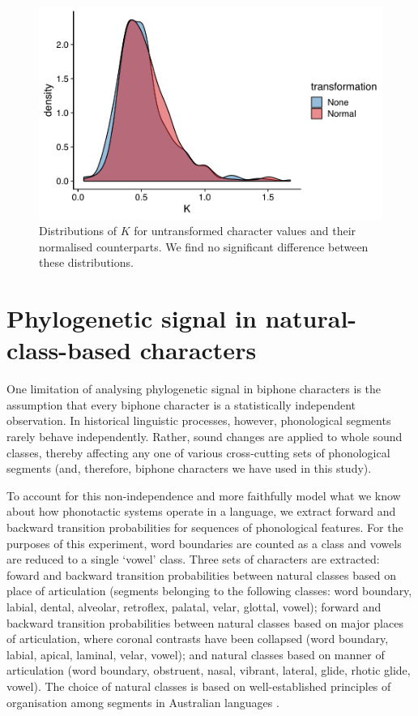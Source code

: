 \begin{figure}

{\centering \includegraphics[width=0.66\linewidth]{fig/k-orig-norm} 

}

\caption{Distributions of $K$ for untransformed character values and their normalised counterparts. We find no significant difference between these distributions.}\label{fig:orig-vs-nrmlzd}
\end{figure}

\hypertarget{phy-sig-classes}{%
\section{Phylogenetic signal in natural-class-based characters}\label{phy-sig-classes}}

One limitation of analysing phylogenetic signal in biphone characters is the assumption that every biphone character is a statistically independent observation. In historical linguistic processes, however, phonological segments rarely behave independently. Rather, sound changes are applied to whole sound classes, thereby affecting any one of various cross-cutting sets of phonological segments (and, therefore, biphone characters we have used in this study).

To account for this non-independence and more faithfully model what we know about how phonotactic systems operate in a language, we extract forward and backward transition probabilities for sequences of phonological features. For the purposes of this experiment, word boundaries are counted as a class and vowels are reduced to a single `vowel' class. Three sets of characters are extracted: foward and backward transition probabilities between natural classes based on place of articulation (segments belonging to the following classes: word boundary, labial, dental, alveolar, retroflex, palatal, velar, glottal, vowel); forward and backward transition probabilities between natural classes based on major places of articulation, where coronal contrasts have been collapsed (word boundary, labial, apical, laminal, velar, vowel); and natural classes based on manner of articulation (word boundary, obstruent, nasal, vibrant, lateral, glide, rhotic glide, vowel). The choice of natural classes is based on well-established principles of organisation among segments in Australian languages \autocites{dixon_languages_1980}{hamilton_phonetic_1996}{baker_word_2014}{round_segment_2020}{round_phonotactics_2020}.

